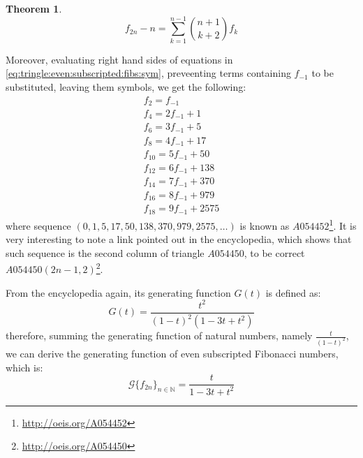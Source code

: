 \documentclass[a4paper,dottedtoc,headinclude,footinclude]{report} %
\theoremstyle{plain}
\newtheorem{thm}{Theorem}[section]
\begin{document}
    \begin{thm}
        \begin{displaymath}
            f_{2n} - n = \sum_{k=1}^{n-1}{{{n+1}\choose{k+2}}f_{k}}
        \end{displaymath}
    \end{thm}

    Moreover, evaluating right hand sides of equations in 
    \autoref{eq:tringle:even:subscripted:fibs:sym}, preveenting terms
    containing $f_{-1}$ to be substituted, leaving them symbols, we get
    the following:
    \begin{displaymath}
        \begin{array}{c}
            f_{2} = f_{-1}\\
            f_{4} = 2 f_{-1} + 1\\
            f_{6} = 3 f_{-1} + 5\\
            f_{8} = 4 f_{-1} + 17\\
            f_{10} = 5 f_{-1} + 50\\
            f_{12} = 6 f_{-1} + 138\\
            f_{14} = 7 f_{-1} + 370\\
            f_{16} = 8 f_{-1} + 979\\
            f_{18} = 9 f_{-1} + 2575
        \end{array}
    \end{displaymath}
    where sequence $(0,1,5,17,50,138,370,979,2575,\ldots)$ is known as 
    $A054452$\footnote{\url{http://oeis.org/A054452}}. It is very interesting
    to note a link pointed out in the encyclopedia, which shows that
    such sequence is the second column of triangle $A054450$, to be 
    correct $A054450(2n-1,2)$\footnote{\url{http://oeis.org/A054450}}.
    
    From the encyclopedia again, its generating function $G(t)$ is defined as:
    \begin{displaymath}
        G(t) = \frac{t^2}{(1-t)^2 (1-3t+t^2)}
    \end{displaymath}
    therefore, summing the generating function of natural numbers, namely
    $\frac{t}{(1-t)^2}$, we can derive the generating function of even
    subscripted Fibonacci numbers, which is:
    \begin{displaymath}
        \mathcal{G}\lbrace f_{2n}\rbrace_{n\in\mathbb{N}} = \frac{t}{1 -3t +t^2}
    \end{displaymath}

        
\end{document}
